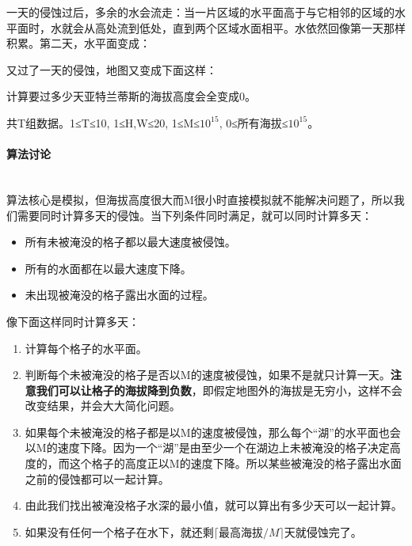 \documentclass[UTF8]{ctexart}
\newcommand{\myparagraph}[1]{\paragraph{#1}\mbox{}\\}
\theoremstyle{nonumberplain}
\begin{document}
			\begin{center}\end{center}
		
			一天的侵蚀过后，多余的水会流走：当一片区域的水平面高于与它相邻的区域的水平面时，水就会从高处流到低处，直到两个区域水面相平。水依然回像第一天那样积累。第二天，水平面变成：
		
			\begin{center}\end{center}
		
			又过了一天的侵蚀，地图又变成下面这样：
		
			\begin{center}\end{center}
		
			计算要过多少天亚特兰蒂斯的海拔高度会全变成0。
			
			共T组数据。1≤T≤10, 1≤H,W≤20, 1≤M≤$10^{15}$, 0≤所有海拔≤$10^{15}$。
			
		\myparagraph{算法讨论}
		
			算法核心是模拟，但海拔高度很大而M很小时直接模拟就不能解决问题了，所以我们需要同时计算多天的侵蚀。当下列条件同时满足，就可以同时计算多天：
		
			\begin{itemize}[leftmargin=15mm]
				\item 所有未被淹没的格子都以最大速度被侵蚀。
				\item 所有的水面都在以最大速度下降。
				\item 未出现被淹没的格子露出水面的过程。
			\end{itemize}
		
			像下面这样同时计算多天：
		
			\begin{enumerate}[leftmargin=15mm]
				\item 计算每个格子的水平面。
				\item 判断每个未被淹没的格子是否以M的速度被侵蚀，如果不是就只计算一天。\textbf{注意我们可以让格子的海拔降到负数}，即假定地图外的海拔是无穷小，这样不会改变结果，并会大大简化问题。
				\item 如果每个未被淹没的格子都是以M的速度被侵蚀，那么每个“湖”的水平面也会以M的速度下降。因为一个“湖”是由至少一个在湖边上未被淹没的格子决定高度的，而这个格子的高度正以M的速度下降。所以某些被淹没的格子露出水面之前的侵蚀都可以一起计算。
				\item 由此我们找出被淹没格子水深的最小值，就可以算出有多少天可以一起计算。
				\item 如果没有任何一个格子在水下，就还剩$\lceil \mbox{最高海拔}/M \rceil$天就侵蚀完了。
			\end{enumerate}
		
\end{document}
